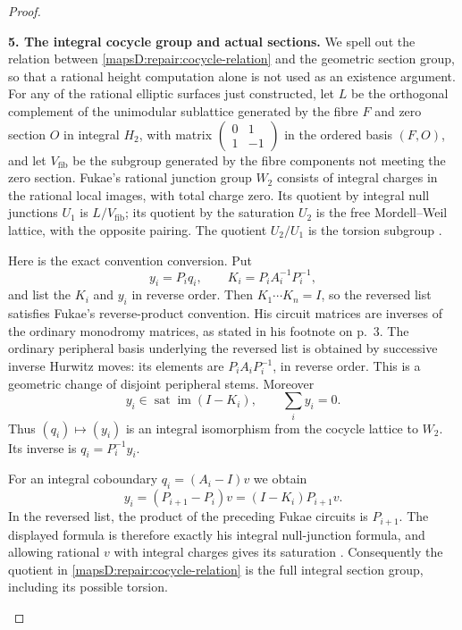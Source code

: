 \begin{proof}
\begin{enumerate}[label=\arabic*.,leftmargin=*]
\par\medskip\noindent\textbf{5. The integral cocycle group and actual sections.}\quad 
We spell out the relation between
\eqref{mapsD:repair:cocycle-relation} and the geometric section
group, so that a rational height computation alone is not used
as an existence argument.  For any of the rational elliptic
surfaces just constructed, let $L$ be the orthogonal complement
of the unimodular sublattice generated by the fibre $F$ and zero section $O$ in integral $H_2$, with matrix $\left(\begin{smallmatrix}0&1\\1&-1\end{smallmatrix}\right)$ in the ordered basis $(F,O)$, and let $V_{\mathrm{fib}}$ be the subgroup generated by
the fibre components not meeting the zero section.  Fukae's
rational junction group $W_2$ consists of integral charges in
the rational local images, with total charge zero.  Its quotient
by integral null junctions $U_1$ is $L/V_{\mathrm{fib}}$;
its quotient by the saturation $U_2$ is the free Mordell--Weil
lattice, with the opposite pairing.  The quotient $U_2/U_1$
is the torsion subgroup
\cite[Lemma~4.1, Theorem~4.2 and Corollaries~4.2--4.3,
pp.~21--22]{manFukae02}.

Here is the exact convention conversion.  Put
\[
 y_i=P_iq_i,\qquad K_i=P_iA_i^{-1}P_i^{-1},
\]
and list the $K_i$ and $y_i$ in reverse order.  Then
$K_1\cdots K_n=I$, so the reversed list satisfies Fukae's
reverse-product convention.  His circuit matrices are inverses
of the ordinary monodromy matrices, as stated in his footnote
on p.~3.  The ordinary peripheral basis underlying the reversed
list is obtained by successive inverse Hurwitz moves:
its elements are $P_iA_iP_i^{-1}$, in reverse order.  This is a
geometric change of disjoint peripheral stems.  Moreover
\[
 y_i\in\operatorname{sat}\operatorname{im}(I-K_i),\qquad
 \sum_i y_i=0.
\]
Thus $(q_i)\mapsto(y_i)$ is an integral isomorphism from the
cocycle lattice to $W_2$.  Its inverse is $q_i=P_i^{-1}y_i$.

For an integral coboundary $q_i=(A_i-I)v$ we obtain
\[
 y_i=(P_{i+1}-P_i)v
     =(I-K_i)P_{i+1}v.
\]
In the reversed list, the product of the preceding Fukae
circuits is $P_{i+1}$.  The displayed formula is therefore
exactly his integral null-junction formula, and allowing
rational $v$ with integral charges gives its saturation
\cite[Lemmas~3.1--3.2, (11), pp.~11--13]{manFukae02}.
Consequently the quotient in
\eqref{mapsD:repair:cocycle-relation} is the full integral
section group, including its possible torsion.


\end{enumerate}
\end{proof}
